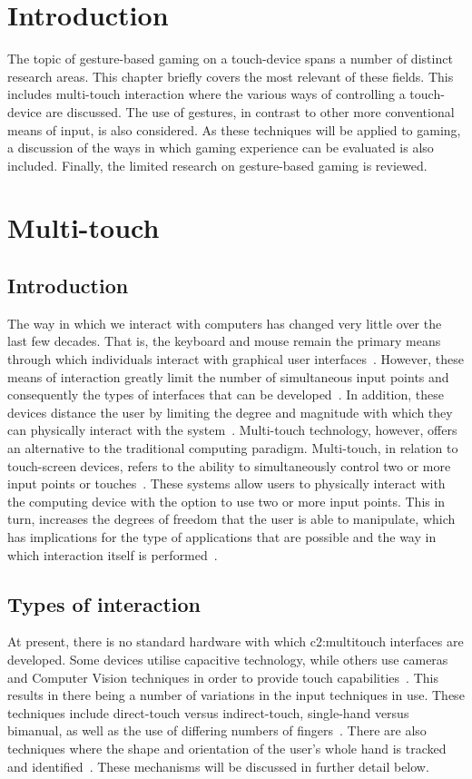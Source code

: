 \section{Introduction}
The topic of gesture-based gaming on a touch-device spans a number of distinct research areas. This chapter briefly covers the most relevant of these fields. This includes multi-touch interaction where the various ways of controlling a touch-device are discussed. The use of gestures, in contrast to other more conventional means of input, is also considered. As these techniques will be applied to gaming, a discussion of the ways in which gaming experience can be evaluated is also included. Finally, the limited research on gesture-based gaming is reviewed.

\section{Multi-touch}
\subsection{Introduction}
The way in which we interact with computers has changed very little over the last few decades. That is, the keyboard and mouse remain the primary means through which individuals interact with graphical user interfaces~\citep{Kin09}. However, these means of interaction greatly limit the number of simultaneous input points and consequently the types of interfaces that can be developed~\citep{Mosc08}. In addition, these devices distance the user by limiting the degree and magnitude with which they can physically interact with the system~\citep{Mosc06}. Multi-touch technology, however, offers an alternative to the traditional computing paradigm. Multi-touch, in relation to touch-screen devices, refers to the ability to simultaneously control two or more input points or touches~\citep{Jaim07}. These systems allow users to physically interact with the computing device with the option to use two or more input points. This in turn, increases the degrees of freedom that the user is able to manipulate, which has implications for the type of applications that are possible and the way in which interaction itself is performed~\citep{Mosc08}.


\subsection{Types of interaction}
At present, there is no standard hardware with which \gls{c2:multitouch} interfaces are developed. Some devices utilise capacitive technology, while others use cameras and Computer Vision techniques in order to provide touch capabilities~\citep{Wigd09}. This results in there being a number of variations in the input techniques in use. These techniques include direct-touch versus indirect-touch, single-hand versus bimanual, as well as the use of differing numbers of fingers~\citep{Kin09}. There are also techniques where the shape and orientation of the user's whole hand is tracked and identified~\citep{Wu03}. These mechanisms will be discussed in further detail below.


